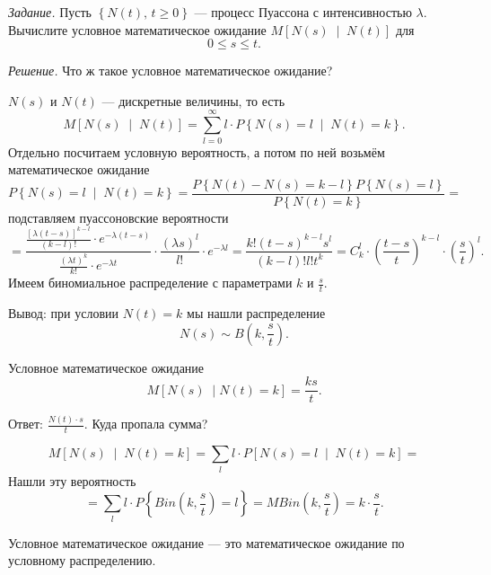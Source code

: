 \textit{Задание.}
Пусть $ \left\{ N \left( t \right), \, t \geq 0 \right\} $ ---
процесс Пуассона с интенсивностью $ \lambda $.
Вычислите условное математическое ожидание
$M \left[ N \left( s \right) \; \middle| \; N \left( t \right) \right] $ для
$$0 \leq s \leq t.$$

\textit{Решение.}
Что ж такое условное математическое ожидание?

$N \left( s \right) $ и $N \left( t \right) $ --- дискретные величины, то есть
$$M \left[ N \left( s \right) \; \middle| \; N \left( t \right) \right] =
  \sum \limits_{l = 0}^{ \infty }
    l \cdot P \left\{ N \left( s \right) = l \; \middle| \; N \left( t \right) = k \right\}.$$
Отдельно посчитаем условную вероятность, а потом по ней возьмём математическое ожидание
$$P \left\{ N \left( s \right) = l \; \middle| \; N \left( t \right) = k \right\} =
  \frac{P \left\{ N \left( t \right) - N \left( s \right) = k - l \right\} P \left\{ N \left( s \right) = l \right\} }{P \left\{ N \left( t \right) = k \right\} } =$$
подставляем пуассоновские вероятности
$$= \frac{ \frac{ \left[ \lambda \left( t - s \right) \right]^{k - l}}{ \left( k - l \right)!} \cdot e^{-\lambda \left( t - s \right) }}{ \frac{ \left( \lambda t \right)^k}{k!} \cdot e^{-\lambda t}} \cdot
  \frac{ \left( \lambda s \right)^l}{l!} \cdot e^{-\lambda l} =
  \frac{k! \left( t - s \right)^{k - l} s^l}{ \left( k - l \right)! l! t^k} =
  C_k^l \cdot \left( \frac{t - s}{t} \right)^{k - l} \cdot \left( \frac{s}{t} \right)^l.$$
Имеем биномиальное распределение с параметрами $k$ и $ \frac{s}{t}$.

Вывод: при условии $N \left( t \right) = k$ мы нашли распределение
$$N \left( s \right) \sim
  B \left( k, \frac{s}{t} \right).$$

Условное математическое ожидание
$$M \left[ N \left( s \right) \; \middle| N \left( t \right) = k \right] =
  \frac{ks}{t}.$$

Ответ: $ \frac{N \left( t \right) \cdot s}{t}$.
Куда пропала сумма?

$$M \left[ N \left( s \right) \; \middle| \; N \left( t \right) = k \right] =
  \sum \limits_l
    l \cdot P \left[ N \left( s \right) = l \; \middle| \; N \left( t \right) = k \right] =$$
Нашли эту вероятность
$$= \sum \limits_l l \cdot P \left\{ Bin \left( k, \frac{s}{t} \right) = l \right\} =
MBin \left( k, \frac{s}{t} \right) =
k \cdot \frac{s}{t}.$$

Условное математическое ожидание --- это математическое ожидание по условному распределению.

